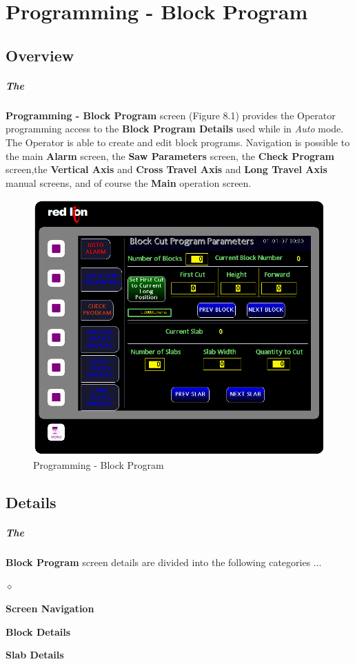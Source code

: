 \chapter{Programming - Block Program}
\section{Overview}\paragraph*{The}\textbf{Programming - Block Program} screen (Figure 8.1) provides the Operator programming access to the \textbf{Block Program Details} used while in \textit{Auto} mode. The Operator is able to create and edit block programs. Navigation is possible to the main \textbf{Alarm} screen, the \textbf{Saw Parameters} screen, the \textbf{Check Program} screen,the \textbf{Vertical Axis} and \textbf{Cross Travel Axis} and \textbf{Long Travel Axis} manual screens, and of course the \textbf{Main} operation screen.
\begin{figure}
	\centering
	\includegraphics[width=0.5\linewidth]{screen-captures/program/cut-pgm}
	\caption{Programming - Block Program}
	\label{fig:prg-block-det}
\end{figure}
\section{Details}\paragraph*{The}\textbf{Block Program} screen details are divided into the following categories ...
\begin{list}{$\diamond$}{}
	\item \textbf{Screen Navigation}
	\item \textbf{Block Details}
	\item \textbf{Slab Details}
\end{list}
\pagebreak
